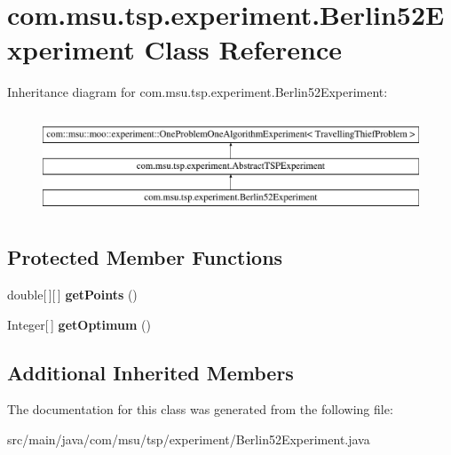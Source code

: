 \hypertarget{classcom_1_1msu_1_1tsp_1_1experiment_1_1Berlin52Experiment}{\section{com.\-msu.\-tsp.\-experiment.\-Berlin52\-Experiment Class Reference}
\label{classcom_1_1msu_1_1tsp_1_1experiment_1_1Berlin52Experiment}
}
Inheritance diagram for com.\-msu.\-tsp.\-experiment.\-Berlin52\-Experiment\-:\begin{figure}[H]
\begin{center}
\leavevmode
\includegraphics[height=3.000000cm]{classcom_1_1msu_1_1tsp_1_1experiment_1_1Berlin52Experiment}
\end{center}
\end{figure}
\subsection*{Protected Member Functions}
\begin{DoxyCompactItemize}
\item 
\hypertarget{classcom_1_1msu_1_1tsp_1_1experiment_1_1Berlin52Experiment_a5149fdd1771427ccb5817e40ecd9f389}{double\mbox{[}$\,$\mbox{]}\mbox{[}$\,$\mbox{]} {\bfseries get\-Points} ()}\label{classcom_1_1msu_1_1tsp_1_1experiment_1_1Berlin52Experiment_a5149fdd1771427ccb5817e40ecd9f389}

\item 
\hypertarget{classcom_1_1msu_1_1tsp_1_1experiment_1_1Berlin52Experiment_af52644a24c2e905a93e64077090cf448}{Integer\mbox{[}$\,$\mbox{]} {\bfseries get\-Optimum} ()}\label{classcom_1_1msu_1_1tsp_1_1experiment_1_1Berlin52Experiment_af52644a24c2e905a93e64077090cf448}

\end{DoxyCompactItemize}
\subsection*{Additional Inherited Members}


The documentation for this class was generated from the following file\-:\begin{DoxyCompactItemize}
\item 
src/main/java/com/msu/tsp/experiment/Berlin52\-Experiment.\-java\end{DoxyCompactItemize}
